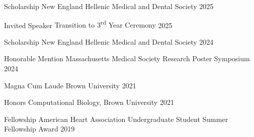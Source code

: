 

\begin{cvhonors}

  \cvhonor
  {Scholarship} %
  {New England Hellenic Medical and Dental Society} %
  {2025} %

  \cvhonor
  {Invited Speaker} %
  {Transition to 3\textsuperscript{rd} Year Ceremony} %
  {2025} %

  \cvhonor
  {Scholarship} %
  {New England Hellenic Medical and Dental Society} %
  {2024} %

  \cvhonor
  {Honorable Mention} %
  {Massachusetts Medical Society Research Poster Symposium} %
  {2024} %

  \cvhonor
  {Magna Cum Laude} %
  {Brown University} %
  {2021} %

  \cvhonor
  {Honors} %
  {Computational Biology, Brown University} %
  {2021} %

  \cvhonor
  {Fellowship} %
  {American Heart Association Undergraduate Student Summer Fellowship Award} %
  {2019} %

\end{cvhonors}
